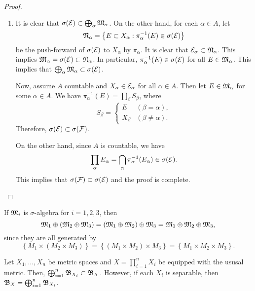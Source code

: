 \documentclass[a4paper]{article}
\begin{document}
{\begin{proof}
\begin{enumerate}
\item It is clear that $\sigma(\mathcal{E}) \subset \bigoplus_\alpha 
\mathfrak{M}_\alpha$. On the other hand, for each $\alpha \in A$, let
\[
  \mathfrak{N}_\alpha = \left\{ E \subset X_\alpha : \pi^{-1}_\alpha 
  (E) \in \sigma(\mathcal{E}) \right\}
\]
be the push-forward 
of $\sigma(\mathcal{E})$ to $X_\alpha$ by $\pi_\alpha$. 
It is clear that $\mathcal{E}_\alpha \subset \mathfrak{N}_\alpha$.
This implies $\mathfrak{M}_\alpha = \sigma(\mathcal{E}) \subset \mathfrak{N}_\alpha$.
In particular, $\pi_\alpha^{-1}(E) \in \sigma(\mathcal{E})$
for all $E \in \mathfrak{M}_\alpha$. This implies that 
$\bigoplus_\alpha \mathfrak{M}_\alpha \subset \sigma(\mathcal{E})$.

Now, assume $A$ countable and $X_\alpha \in \mathcal{E}_\alpha$
for all $\alpha \in A$. Then let $E \in \mathfrak{M}_\alpha$
for some $\alpha \in A$. We have 
$\pi^{-1}_\alpha(E) = \prod_\beta S_\beta$, where 
\[
S_\beta = \begin{cases}
  E & (\beta = \alpha), \\
  X_\beta & (\beta \neq \alpha).
\end{cases}
\]
Therefore, $\sigma(\mathcal{E}) \subset \sigma(\mathcal{F})$. 

On the other hand, since $A$ is countable, we have 
\[
\prod_\alpha E_\alpha = \bigcap_\alpha \pi_\alpha^{-1} 
(E_\alpha) \in \sigma(\mathcal{E}).
\]
This implies that $\sigma(\mathcal{F}) \subset \sigma(\mathcal{E})$
and the proof is complete.

\end{enumerate}
\end{proof}
}

\begin{cor}
  If $\mathfrak{M}_i$ is $\sigma$-algebra for $i = 1, 2, 3$, then 
  \[
  \mathfrak{M}_1 \oplus (\mathfrak{M}_2 \oplus \mathfrak{M}_3) 
  = (\mathfrak{M}_1 \oplus \mathfrak{M}_2) \oplus \mathfrak{M}_3
  = \mathfrak{M}_1 \oplus \mathfrak{M}_2 \oplus \mathfrak{M}_3,
  \]
  since they are all generated by 
  \[
  \left\{ M_1 \times (M_2 \times M_3) \right\}
  = \left\{ (M_1 \times M_2) \times M_3 \right\}
  = \left\{ M_1 \times M_2 \times M_3 \right\}.
  \]
\end{cor}

\begin{thm}
  Let $X_1, \dots, X_n$ be metric spaces and 
  $X = \prod_{i=1}^n X_i$ be equipped with the ususal 
  metric. Then, $\bigoplus_{i=1}^n \mathfrak{B}_{X_i} \subset 
  \mathfrak{B}_X$. However, if each $X_i$ is separable, 
  then $\mathfrak{B}_X = \bigoplus_{i=1}^n \mathfrak{B}_{X_i}$.
\end{thm}
\end{document}
